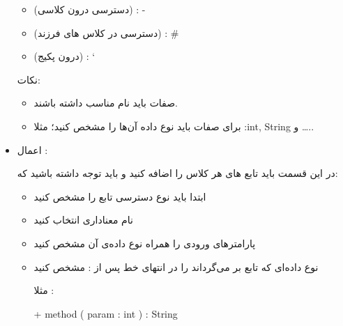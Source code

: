\documentclass[]{article}
\begin{document}
\begin{itemize}[label=\textcolor{listColor}{$\blacklozenge$}]
\begin{itemize}[label={\textbullet}]
\item
{} (دسترسی درون کلاسی) :    -

\item
{} (دسترسی در کلاس های فرزند) :    \#

\item
{} (درون پکیج) :    \char`~



\end{itemize}

نکات:

\begin{itemize}[label={\textbullet}]

\item
صفات باید نام مناسب داشته باشند.

\item
برای صفات باید نوع داده آن‌ها را مشخص کنید؛ مثلا :int, String و …..


\end{itemize}
   
   \item
   {\fehrest \textcolor{listColor}{اعمال :}}
   
   در این قسمت باید تابع های هر کلاس  را اضافه کنید و باید توجه داشته باشید که:
   
\begin{itemize}[label={\textbullet}]

\item
ابتدا باید نوع دسترسی تابع را مشخص کنید

\item
نام معناداری انتخاب کنید

\item
پارامتر‌های ورودی را همراه نوع داده‌ی آن مشخص کنید

\item
نوع داده‌ای که تابع بر می‌گرداند  را  در انتهای خط پس از : مشخص کنید

مثلا :

\begin{center}
\begin{latin}
+ method ( param : int ) : String

\end{latin}
\end{center}



\end{itemize}   


\begin{center}



\end{center}
\end{itemize}
\end{document}
